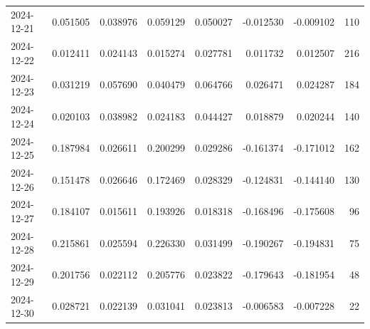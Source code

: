 \begin{tabular}{lrrrrrrr}
2024-12-21 & 0.051505 & 0.038976 & 0.059129 & 0.050027 & -0.012530 & -0.009102 & 110 \\
2024-12-22 & 0.012411 & 0.024143 & 0.015274 & 0.027781 & 0.011732 & 0.012507 & 216 \\
2024-12-23 & 0.031219 & 0.057690 & 0.040479 & 0.064766 & 0.026471 & 0.024287 & 184 \\
2024-12-24 & 0.020103 & 0.038982 & 0.024183 & 0.044427 & 0.018879 & 0.020244 & 140 \\
2024-12-25 & 0.187984 & 0.026611 & 0.200299 & 0.029286 & -0.161374 & -0.171012 & 162 \\
2024-12-26 & 0.151478 & 0.026646 & 0.172469 & 0.028329 & -0.124831 & -0.144140 & 130 \\
2024-12-27 & 0.184107 & 0.015611 & 0.193926 & 0.018318 & -0.168496 & -0.175608 & 96 \\
2024-12-28 & 0.215861 & 0.025594 & 0.226330 & 0.031499 & -0.190267 & -0.194831 & 75 \\
2024-12-29 & 0.201756 & 0.022112 & 0.205776 & 0.023822 & -0.179643 & -0.181954 & 48 \\
2024-12-30 & 0.028721 & 0.022139 & 0.031041 & 0.023813 & -0.006583 & -0.007228 & 22 \\
\bottomrule
\end{tabular}
